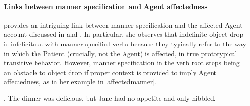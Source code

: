 \paragraph{Links between manner specification and Agent affectedness}
\textcite[139]{Naess2007} provides an intriguing link between manner specification and the affected-Agent account discussed in  and . In particular, she observes that indefinite object drop is infelicitous with manner-specified verbs because they typically refer to the way in which the Patient (crucially, not the Agent) is affected, in true prototypical transitive behavior. However, manner specification in the verb root stops being an obstacle to object drop if proper context is provided to imply Agent affectedness, as in her example in \ref{affectedmanner}.

\ex. \label{affectedmanner} The dinner was delicious, but Jane had no appetite and only nibbled.

